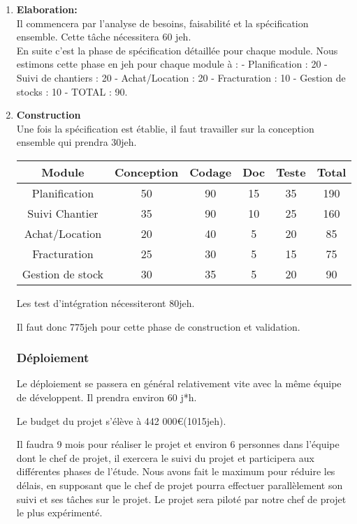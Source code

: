     \begin{enumerate}
    \item \textbf{Elaboration:}\\ Il commencera par l'analyse de besoins, faisabilité et la spécification ensemble. Cette tâche nécessitera  60 jeh. \\

    En suite c'est la phase de spécification détaillée pour chaque module. Nous estimons cette phase en jeh pour chaque module à :
         - Planification : 20
         - Suivi de chantiers : 20 
         - Achat/Location : 20 
         - Fracturation : 10
         - Gestion de stocks : 10 
         - TOTAL : 90.

    \item \textbf{Construction}\\
    Une fois la spécification est établie, il faut travailler sur la conception ensemble qui prendra 30jeh. 

    \begin{center} 
        \begin{tabular}{ |c| c| c | c | c |c |}
        \hline
	    Module&Conception&Codage&Doc&Teste&Total\\ \hline
        Planification & 50 & 90 & 15 &35&190\\ \hline
        Suivi Chantier &35&90&10&25&160 \\ \hline
        Achat/Location &20&40&5&20&85  \\ \hline
        Fracturation &25&30&5&15&75\\ \hline
        Gestion de stock &30&35&5&20&90 \\
        \hline
        \end{tabular}
    \end{center}

    Les test d'intégration nécessiteront 80jeh.

    Il faut donc 775jeh pour cette phase de construction et validation.

    \subsubsection{Déploiement}

    Le déploiement se passera en général relativement vite avec la même équipe de développent. Il prendra environ 60 j*h.

    Le budget du projet s'élève à 442 000€(1015jeh).

    Il faudra 9 mois pour réaliser le projet et environ 6 personnes dans l'équipe dont le chef de projet, il exercera le suivi du projet et participera aux différentes phases de l'étude. Nous avons fait le maximum pour réduire les délais, en supposant que le chef de projet pourra effectuer parallèlement son suivi et ses tâches sur le projet. Le projet sera piloté par notre chef de projet le plus expérimenté.


\end{enumerate}
